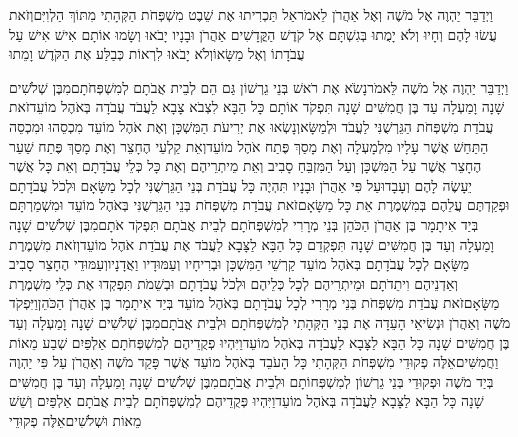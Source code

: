 \documentclass[../main/main.tex]{subfiles}
\begin{document}
\begin{multicols}{\ncols}
וַיְדַבֵּר יַהְוֶה אֶל מֹשֶׁה וְאֶל אַהֲרֹן לֵאמֹר\PreVerseSpace{}אַל תַּכְרִיתוּ אֶת שֵׁבֶט מִשְׁפְּחֹת הַקְּהָתִי מִתּוֹךְ הַלְוִיִּם\PreVerseSpace{}וְזֹאת עֲשׂוּ לָהֶם וְחָיוּ וְלֹא יָמֻתוּ בְּגִשְׁתָּם אֶל\SubEnd{} קֹדֶשׁ הַקֳּדָשִׁים אַהֲרֹן וּבָנָיו יָבֹאוּ וְשָׂמוּ אוֹתָם אִישׁ אִישׁ עַל עֲבֹדָתוֹ וְאֶל מַשָּׂאוֹ\PreVerseSpace{}וְלֹא יָבֹאוּ לִרְאוֹת כְּבַלַּע אֶת הַקֹּדֶשׁ וָמֵתוּ\OpenSection{}\par
{}וַיְדַבֵּר יַהְוֶה אֶל מֹשֶׁה לֵּאמֹר\PreVerseSpace{}נָשֹׂא אֶת רֹאשׁ בְּנֵי גֵרְשׁוֹן גַּם הֵם לְבֵית אֲבֹתָם לְמִשְׁפְּחֹתָם\PreVerseSpace{}מִבֶּן שְׁלֹשִׁים שָׁנָה וָמַעְלָה עַד בֶּן חֲמִשִּׁים שָׁנָה תִּפְקֹד אוֹתָם כָּל הַבָּא לִצְבֹא צָבָא לַעֲבֹד עֲבֹדָה בְּאֹהֶל מוֹעֵד\PreVerseSpace{}זֹאת עֲבֹדַת מִשְׁפְּחֹת הַגֵּרְשֻׁנִּי לַעֲבֹד וּלְמַשָּׂא\PreVerseSpace{}וְנָשְׂאוּ אֶת יְרִיעֹת הַמִּשְׁכָּן וְאֶת אֹהֶל מוֹעֵד מִכְסֵהוּ וּמִכְסֵה הַתַּחַשׁ אֲשֶׁר עָלָיו מִלְמָעְלָה וְאֶת מָסַךְ פֶּתַח אֹהֶל מוֹעֵד\PreVerseSpace{}וְאֵת קַלְעֵי הֶחָצֵר וְאֶת מָסַךְ פֶּתַח שַׁעַר הֶחָצֵר אֲשֶׁר עַל הַמִּשְׁכָּן וְעַל הַמִּזְבֵּחַ סָבִיב וְאֵת מֵיתְרֵיהֶם וְאֶת כָּל כְּלֵי עֲבֹדָתָם וְאֵת כָּל אֲשֶׁר יֵעָשֶׂה לָהֶם וְעָבָדוּ\PreVerseSpace{}עַל פִּי אַהֲרֹן וּבָנָיו תִּהְיֶה כָּל עֲבֹדַת בְּנֵי הַגֵּרְשֻׁנִּי לְכָל מַשָּׂאָם וּלְכֹל עֲבֹדָתָם וּפְקַדְתֶּם עֲלֵהֶם בְּמִשְׁמֶרֶת אֵת כָּל מַשָּׂאָם\PreVerseSpace{}זֹאת עֲבֹדַת מִשְׁפְּחֹת בְּנֵי הַגֵּרְשֻׁנִּי בְּאֹהֶל מוֹעֵד וּמִשְׁמַרְתָּם בְּיַד אִיתָמָר בֶּן אַהֲרֹן הַכֹּהֵן \ClosedSection{}בְּנֵי מְרָרִי לְמִשְׁפְּחֹתָם לְבֵית אֲבֹתָם תִּפְקֹד אֹתָם\PreVerseSpace{}מִבֶּן שְׁלֹשִׁים שָׁנָה וָמַעְלָה וְעַד בֶּן חֲמִשִּׁים שָׁנָה תִּפְקְדֵם כָּל הַבָּא לַצָּבָא לַעֲבֹד אֶת עֲבֹדַת אֹהֶל מוֹעֵד\PreVerseSpace{}וְזֹאת מִשְׁמֶרֶת מַשָּׂאָם לְכָל עֲבֹדָתָם בְּאֹהֶל מוֹעֵד קַרְשֵׁי הַמִּשְׁכָּן וּבְרִיחָיו וְעַמּוּדָיו וַאֲדָנָיו\PreVerseSpace{}וְעַמּוּדֵי הֶחָצֵר סָבִיב וְאַדְנֵיהֶם וִיתֵדֹתָם וּמֵיתְרֵיהֶם לְכָל כְּלֵיהֶם וּלְכֹל עֲבֹדָתָם וּבְשֵׁמֹת תִּפְקְדוּ אֶת כְּלֵי מִשְׁמֶרֶת מַשָּׂאָם\PreVerseSpace{}זֹאת עֲבֹדַת מִשְׁפְּחֹת בְּנֵי מְרָרִי לְכָל עֲבֹדָתָם בְּאֹהֶל מוֹעֵד בְּיַד אִיתָמָר בֶּן אַהֲרֹן הַכֹּהֵן\PreVerseSpace{}וַיִּפְקֹד מֹשֶׁה וְאַהֲרֹן וּנְשִׂיאֵי הָעֵדָה אֶת בְּנֵי הַקְּהָתִי לְמִשְׁפְּחֹתָם וּלְבֵית אֲבֹתָם\PreVerseSpace{}מִבֶּן שְׁלֹשִׁים שָׁנָה וָמַעְלָה וְעַד בֶּן חֲמִשִּׁים שָׁנָה כָּל הַבָּא לַצָּבָא לַעֲבֹדָה בְּאֹהֶל מוֹעֵד\PreVerseSpace{}וַיִּהְיוּ פְקֻדֵיהֶם לְמִשְׁפְּחֹתָם אַלְפַּיִם שְׁבַע מֵאוֹת וַחֲמִשִּׁים\PreVerseSpace{}אֵלֶּה פְקוּדֵי מִשְׁפְּחֹת הַקְּהָתִי כָּל הָעֹבֵד בְּאֹהֶל מוֹעֵד אֲשֶׁר פָּקַד מֹשֶׁה וְאַהֲרֹן עַל פִּי יַהְוֶה בְּיַד מֹשֶׁה \ClosedSection{}וּפְקוּדֵי בְּנֵי גֵרְשׁוֹן לְמִשְׁפְּחוֹתָם וּלְבֵית אֲבֹתָם\PreVerseSpace{}מִבֶּן שְׁלֹשִׁים שָׁנָה וָמַעְלָה וְעַד בֶּן חֲמִשִּׁים שָׁנָה כָּל הַבָּא לַצָּבָא לַעֲבֹדָה בְּאֹהֶל מוֹעֵד\PreVerseSpace{}וַיִּהְיוּ פְּקֻדֵיהֶם לְמִשְׁפְּחֹתָם לְבֵית אֲבֹתָם אַלְפַּיִם וְשֵׁשׁ מֵאוֹת וּשְׁלֹשִׁים\PreVerseSpace{}אֵלֶּה פְקוּדֵי 
\end{multicols}
\end{document}
